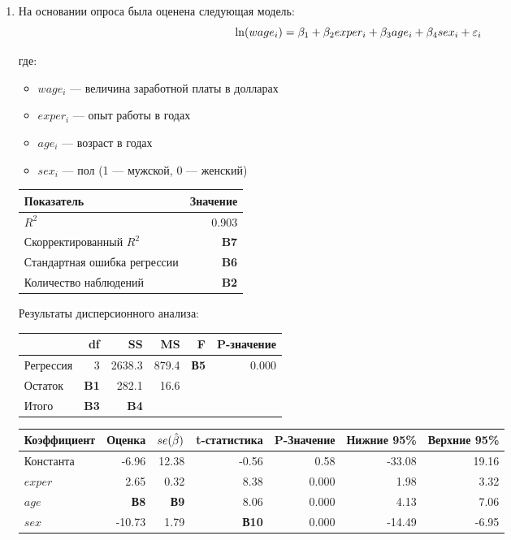 \documentclass[12pt, a4paper]{article}
\begin{document}
\begin{enumerate}


\item На основании опроса была оценена следующая модель:
\[
\ln(wage_i)=\beta_1 + \beta_2 exper_i + \beta_3 age_i + \beta_4 sex_i + \varepsilon_i
\]

где:
\begin{itemize}
\item $wage_i$ — величина заработной платы в долларах
\item $exper_i$ — опыт работы в годах
\item $age_i$ — возраст в годах
\item $sex_i$ — пол (1 — мужской, 0 — женский)
\end{itemize}

\begin{tabular}{lr} \toprule
Показатель & Значение \\
\midrule
$R^2$                        & 0.903 \\
Скорректированный $R^2$      & \textbf{B7} \\
Стандартная ошибка регрессии & \textbf{B6} \\
Количество наблюдений        & \textbf{B2} \\
\bottomrule
\end{tabular}

Результаты дисперсионного анализа:

\begin{tabular}{lrrrrr} \toprule
 & df & SS & MS & F & P-значение \\
\midrule
Регрессия   &  3 & 2638.3  & 879.4 & \textbf{В5} & 0.000 \\
Остаток     & \textbf{B1} & 282.1 & 16.6 &    &       \\
Итого       & \textbf{B3}  & \textbf{B4}     &       &    &       \\
\bottomrule
\end{tabular}


\begin{tabular}{lrrrrrr} \toprule
Коэффициент & Оценка & $se(\hat{\beta})$ & t-статистика & P-Значение & Нижние 95\% & Верхние 95\% \\
\midrule
Константа & -6.96 & 12.38 & -0.56 & 0.58 & -33.08 & 19.16 \\
$exper$ & 2.65 & 0.32 & 8.38 & 0.000 & 1.98 & 3.32 \\
$age$ & \textbf{В8} & \textbf{В9} & 8.06 & 0.000 & 4.13 & 7.06 \\
$sex$ & -10.73 & 1.79 & \textbf{В10} & 0.000 & -14.49 & -6.95 \\
\bottomrule
\end{tabular}


\end{enumerate}
\end{document}
